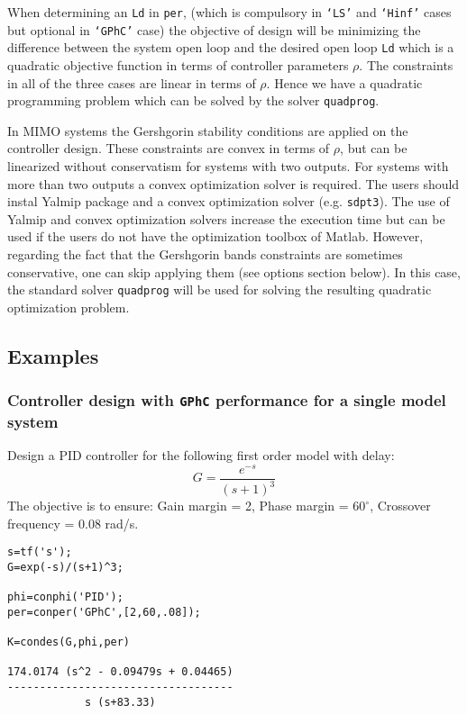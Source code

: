 \documentclass [12pt , a4paper] {report}
\begin{document}
When determining an \texttt{Ld} in \texttt{per}, (which is compulsory in \texttt{`LS'} and \texttt{`Hinf'} cases but optional in \texttt{`GPhC'} case) the objective of design will be minimizing the difference between the system open loop and the desired open loop \texttt{Ld} which is a quadratic objective function in terms of controller parameters $\rho$. The constraints in all of the three cases are linear in terms of $\rho$. Hence we have a quadratic programming problem which can be solved by the solver \texttt{quadprog}.


In MIMO systems the Gershgorin stability conditions are applied on the controller design. These constraints are convex in terms of $\rho$, but can be linearized without conservatism for systems with two outputs. For systems with more than two outputs a convex optimization solver is required. The users should instal Yalmip package and a convex optimization solver (e.g. \texttt{sdpt3}). The use of Yalmip and convex optimization solvers increase the execution time but can be used if the users do not have the optimization toolbox of Matlab.  However, regarding the fact that the Gershgorin bands constraints are sometimes conservative, one can skip applying them (see options section below). In this case, the standard solver \texttt{quadprog} will be used for solving the resulting quadratic optimization problem.

\subsection{Examples}

\subsubsection{Controller design with {\tt GPhC} performance for a single model system}
Design a PID controller for the following first order model with delay:
$$G=\frac{e^{-s}}{(s+1)^3}$$
The objective is to ensure: Gain margin = 2, Phase margin = $60^{\circ}$, Crossover frequency = 0.08 rad/s. 
\begin{lstlisting}
s=tf('s');
G=exp(-s)/(s+1)^3;

phi=conphi('PID');
per=conper('GPhC',[2,60,.08]);

K=condes(G,phi,per)
 
174.0174 (s^2 - 0.09479s + 0.04465)
-----------------------------------
            s (s+83.33)  
            
\end{lstlisting}
\end{document}
